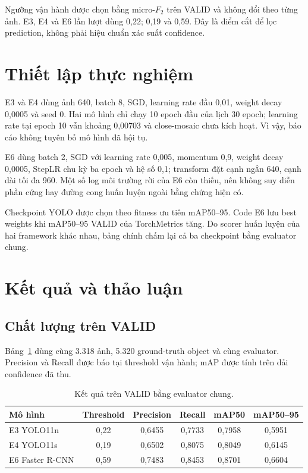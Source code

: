 \documentclass[10pt,a4paper,twocolumn]{article}
\begin{document}
Ngưỡng vận hành được chọn bằng micro-$F_2$ trên VALID và không đổi theo từng ảnh. E3, E4 và E6 lần lượt dùng 0,22; 0,19 và 0,59. Đây là điểm cắt để lọc prediction, không phải hiệu chuẩn xác suất confidence.

\section{Thiết lập thực nghiệm}
E3 và E4 dùng ảnh 640, batch 8, SGD, learning rate đầu 0,01, weight decay 0,0005 và seed 0. Hai mô hình chỉ chạy 10 epoch đầu của lịch 30 epoch; learning rate tại epoch 10 vẫn khoảng 0,00703 và close-mosaic chưa kích hoạt. Vì vậy, báo cáo không tuyên bố mô hình đã hội tụ.

E6 dùng batch 2, SGD với learning rate 0,005, momentum 0,9, weight decay 0,0005, StepLR chu kỳ ba epoch và hệ số 0,1; transform đặt cạnh ngắn 640, cạnh dài tối đa 960. Một số log môi trường rời của E6 còn thiếu, nên không suy diễn phần cứng hay đường cong huấn luyện ngoài bằng chứng hiện có.

Checkpoint YOLO được chọn theo fitness ưu tiên mAP50--95. Code E6 lưu best weights khi mAP50--95 VALID của TorchMetrics tăng. Do scorer huấn luyện của hai framework khác nhau, bảng chính chấm lại cả ba checkpoint bằng evaluator chung.

\section{Kết quả và thảo luận}
\subsection{Chất lượng trên VALID}
Bảng~\ref{tab:valid} dùng cùng 3.318 ảnh, 5.320 ground-truth object và cùng evaluator. Precision và Recall được báo tại threshold vận hành; mAP được tính trên dải confidence đã thu.
\begin{table}[ht]
\centering
\caption{Kết quả trên VALID bằng evaluator chung.}\label{tab:valid}
\begin{tabular}{lccccc}\toprule
Mô hình & Threshold & Precision & Recall & mAP50 & mAP50--95\\\midrule
E3 YOLO11n & 0,22 & 0,6455 & 0,7733 & 0,7958 & 0,5951\\
E4 YOLO11s & 0,19 & 0,6502 & 0,8075 & 0,8049 & 0,6145\\
E6 Faster R-CNN & 0,59 & 0,7483 & 0,8453 & 0,8701 & 0,6604\\\bottomrule
\end{tabular}
\end{table}
\end{document}

